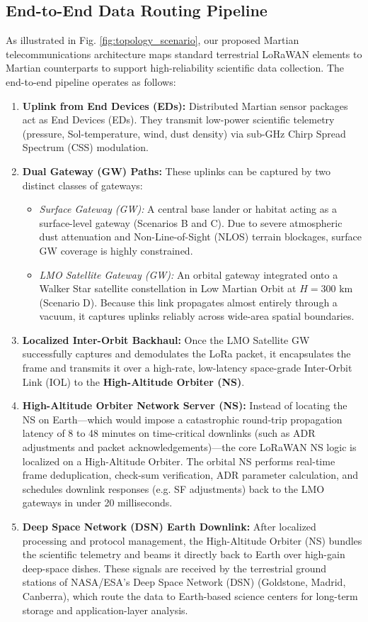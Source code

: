 \documentclass{ijuc}
\begin{document}
\subsection{End-to-End Data Routing Pipeline}
As illustrated in Fig. \ref{fig:topology_scenario}, our proposed Martian telecommunications architecture maps standard terrestrial LoRaWAN elements to Martian counterparts to support high-reliability scientific data collection. The end-to-end pipeline operates as follows:
\begin{enumerate}
    \item \textbf{Uplink from End Devices (EDs):} Distributed Martian sensor packages act as End Devices (EDs). They transmit low-power scientific telemetry (pressure, Sol-temperature, wind, dust density) via sub-GHz Chirp Spread Spectrum (CSS) modulation. 
    \item \textbf{Dual Gateway (GW) Paths:} These uplinks can be captured by two distinct classes of gateways:
    \begin{itemize}
        \item \textit{Surface Gateway (GW):} A central base lander or habitat acting as a surface-level gateway (Scenarios B and C). Due to severe atmospheric dust attenuation and Non-Line-of-Sight (NLOS) terrain blockages, surface GW coverage is highly constrained.
        \item \textit{LMO Satellite Gateway (GW):} An orbital gateway integrated onto a Walker Star satellite constellation in Low Martian Orbit at $H = 300\text{ km}$ (Scenario D). Because this link propagates almost entirely through a vacuum, it captures uplinks reliably across wide-area spatial boundaries.
    \end{itemize}
    \item \textbf{Localized Inter-Orbit Backhaul:} Once the LMO Satellite GW successfully captures and demodulates the LoRa packet, it encapsulates the frame and transmits it over a high-rate, low-latency space-grade Inter-Orbit Link (IOL) to the \textbf{High-Altitude Orbiter (NS)}. 
    \item \textbf{High-Altitude Orbiter Network Server (NS):} Instead of locating the NS on Earth—which would impose a catastrophic round-trip propagation latency of 8 to 48 minutes on time-critical downlinks (such as ADR adjustments and packet acknowledgements)—the core LoRaWAN NS logic is localized on a High-Altitude Orbiter. The orbital NS performs real-time frame deduplication, check-sum verification, ADR parameter calculation, and schedules downlink responses (e.g. SF adjustments) back to the LMO gateways in under 20 milliseconds.
    \item \textbf{Deep Space Network (DSN) Earth Downlink:} After localized processing and protocol management, the High-Altitude Orbiter (NS) bundles the scientific telemetry and beams it directly back to Earth over high-gain deep-space dishes. These signals are received by the terrestrial ground stations of NASA/ESA's Deep Space Network (DSN) (Goldstone, Madrid, Canberra), which route the data to Earth-based science centers for long-term storage and application-layer analysis.
\end{enumerate}
\end{document}
